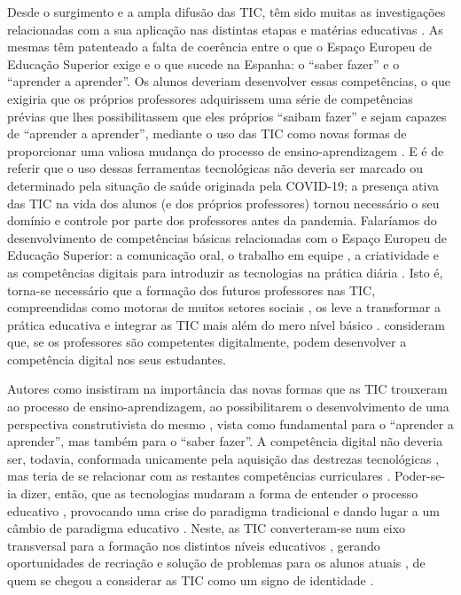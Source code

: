 \documentclass{textolivre}
\begin{document}
Desde o surgimento e a ampla difusão das TIC, têm sido muitas as investigações
relacionadas com a sua aplicação nas distintas etapas e matérias educativas
\cite{gallego2009,espana2013,romeroMartn2017,garridomiranda2018,CasalOtero2018,rodriguez2019,padillahernndez2020}.
As mesmas têm patenteado
a falta de coerência entre o que o Espaço Europeu de Educação Superior exige e
o que sucede na Espanha: o “saber fazer” e o “aprender a aprender”. Os alunos
deveriam desenvolver essas competências, o que exigiria que os próprios
professores adquirissem uma série de competências prévias que lhes
possibilitassem que eles próprios “saibam fazer” e sejam capazes de “aprender a
aprender”, mediante o uso das TIC como novas formas de proporcionar uma valiosa
mudança do processo de ensino-aprendizagem \cite{lopes2018}. E é de referir
que o uso dessas ferramentas tecnológicas não deveria ser marcado ou
determinado pela situação de saúde originada pela COVID-19; a presença ativa
das TIC na vida dos alunos (e dos próprios professores) tornou necessário o seu
domínio e controle por parte dos professores \cite{roldan2016} antes da pandemia.
Falaríamos do desenvolvimento de competências básicas \cite{galera2011}
relacionadas com o Espaço Europeu de Educação Superior: a comunicação oral, o
trabalho em equipe \cite{alonso2018}, a criatividade e as
competências digitais para introduzir as tecnologias na prática diária
\cite{colasbravo2017}. Isto é, torna-se necessário que a
formação dos futuros professores nas TIC, compreendidas como motoras de muitos
setores sociais \cite{rodrguezcorrea2017}, os leve a transformar a prática
educativa e integrar as TIC mais além do mero nível básico \cite{CasalOtero2018}. 
\textcite{ColsBravoBravo2019} consideram que, se os professores são competentes digitalmente, podem
desenvolver a competência digital nos seus estudantes.

Autores como \textcite{alonso2018} insistiram na importância das
novas formas que as TIC trouxeram ao processo de ensino-aprendizagem, ao
possibilitarem o desenvolvimento de uma perspectiva construtivista do mesmo
\cite{casanova2016}, vista como fundamental para o “aprender a aprender”,
mas também para o “saber fazer”. A competência digital não deveria ser,
todavia, conformada unicamente pela aquisição das destrezas tecnológicas
\cite{palaumartn2019}, mas teria de se relacionar com as restantes
competências curriculares \cite{escudero2018}.
Poder-se-ia dizer, então, que as tecnologias mudaram a forma de entender o
processo educativo \cite{colasbravo2017}, provocando uma crise
do paradigma tradicional \cite{casanova2016} e dando lugar a um câmbio de
paradigma educativo \cite{rodriguez2019}. Neste, as TIC
converteram-se num eixo transversal para a formação nos distintos níveis
educativos \cite{marques2004}, gerando oportunidades de recriação e solução de
problemas para os alunos atuais \cite{rodriguez2012}, de quem se
chegou a considerar as TIC como um signo de identidade \cite{cozargutirrez2015}.
\end{document}
